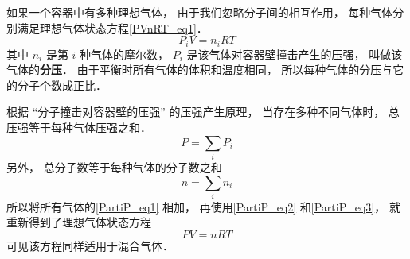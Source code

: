 

如果一个容器中有多种理想气体， 由于我们忽略分子间的相互作用， 每种气体分别满足理想气体状态方程\autoref{PVnRT_eq1}．
\begin{equation}\label{PartiP_eq1}
P_i V = n_i R T
\end{equation}
其中 $n_i$ 是第 $i$ 种气体的摩尔数， $P_i$ 是该气体对容器壁撞击产生的压强， 叫做该气体的\textbf{分压}． 由于平衡时所有气体的体积和温度相同， 所以每种气体的分压与它的分子个数成正比．

根据 “分子撞击对容器壁的压强” 的压强产生原理， 当存在多种不同气体时， 总压强等于每种气体压强之和．
\begin{equation}\label{PartiP_eq2}
P = \sum_i P_i
\end{equation}
另外， 总分子数等于每种气体的分子数之和
\begin{equation}\label{PartiP_eq3}
n = \sum_i n_i
\end{equation}
所以将所有气体的\autoref{PartiP_eq1} 相加， 再使用\autoref{PartiP_eq2} 和\autoref{PartiP_eq3}， 就重新得到了理想气体状态方程
\begin{equation}
P V = n RT
\end{equation}
可见该方程同样适用于混合气体．

